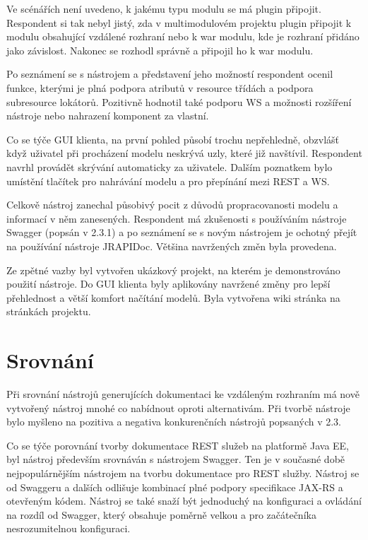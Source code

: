 \documentclass[11pt,twoside,a4paper]{book}
\begin{document}
Ve scénářích není uvedeno, k jakému typu modulu se má plugin připojit. Respondent si tak
nebyl jistý, zda v multimodulovém projektu plugin připojit k modulu obsahující vzdálené
rozhraní nebo k war modulu, kde je rozhraní přidáno jako závislost. Nakonec se rozhodl
správně a připojil ho k war modulu.

Po seznámení se s nástrojem a představení jeho možností respondent ocenil funkce, kterými je
plná podpora atributů v resource třídách a podpora subresource lokátorů. Pozitivně hodnotil
také podporu WS a možnosti rozšíření nástroje nebo nahrazení komponent za vlastní.

Co se týče GUI klienta, na první pohled působí trochu nepřehledně, obzvlášť když uživatel při
procházení modelu neskrývá uzly, které již navštívil. Respondent navrhl provádět skrývání
automaticky za uživatele. Dalším poznatkem bylo umístění tlačítek pro nahrávání modelu a
pro přepínání mezi REST a WS.

Celkově nástroj zanechal působivý pocit z důvodů propracovanosti modelu a informací v něm
zanesených. Respondent má zkušenosti s používáním nástroje Swagger (popsán v 2.3.1) a po
seznámení se s novým nástrojem je ochotný přejít na používání nástroje JRAPIDoc. Většina
navržených změn byla provedena.

Ze zpětné vazby byl vytvořen ukázkový projekt, na kterém je demonstrováno použití nástroje.
Do GUI klienta byly aplikovány navržené změny pro lepší přehlednost a větší komfort
načítání modelů. Byla vytvořena wiki stránka na stránkách projektu.

\chapter{Srovnání}

Při srovnání nástrojů generujících dokumentaci ke vzdáleným rozhraním má nově vytvořený
nástroj mnohé co nabídnout oproti alternativám. Při tvorbě nástroje bylo myšleno na pozitiva
a negativa konkurenčních nástrojů popsaných v 2.3.

Co se týče porovnání tvorby dokumentace REST služeb na platformě Java EE, byl nástroj
především srovnáván s nástrojem Swagger. Ten je v současné době nejpopulárnějším
nástrojem na tvorbu dokumentace pro REST služby. Nástroj se od Swaggeru a dalších
odlišuje kombinací plné podpory specifikace JAX-RS a otevřeným kódem. Nástroj se také
snaží být jednoduchý na konfiguraci a ovládání na rozdíl od Swagger, který obsahuje poměrně
velkou a pro začátečníka nesrozumitelnou konfiguraci.
\end{document}
